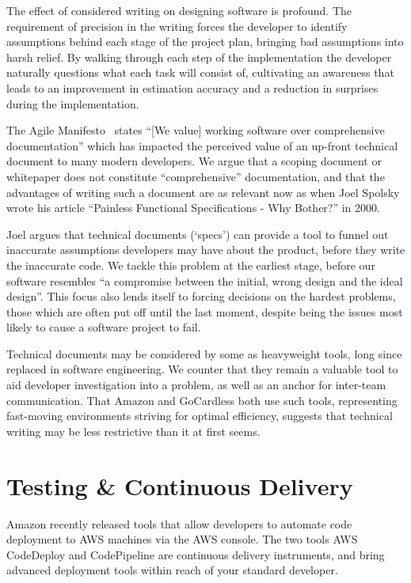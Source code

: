 \documentclass[11pt]{article}
\begin{document}
The effect of considered writing on designing software is profound. The
requirement of precision in the writing forces the developer to identify
assumptions behind each stage of the project plan, bringing bad assumptions into
harsh relief. By walking through each step of the implementation the developer
naturally questions what each task will consist of, cultivating an awareness
that leads to an improvement in estimation accuracy and a reduction in surprises
during the implementation.

The Agile Manifesto~\cite{agileManifesto} states “[We value] working software
over comprehensive documentation” which has impacted the perceived value of an
up-front technical document to many modern developers. We argue that a scoping
document or whitepaper does not constitute “comprehensive” documentation, and
that the advantages of writing such a document are as relevant now as when Joel
Spolsky wrote his article “Painless Functional Specifications - Why Bother?” in
2000.

Joel argues that technical documents (`specs') can provide a tool to funnel out
inaccurate assumptions developers may have about the product, before they write
the inaccurate code. We tackle this problem at the earliest stage, before our
software resembles “a compromise between the initial, wrong design and the ideal
design”. This focus also lends itself to forcing decisions on the hardest
problems, those which are often put off until the last moment, despite being the
issues most likely to cause a software project to fail.

Technical documents may be considered by some as heavyweight tools, long since
replaced in software engineering. We counter that they remain a valuable tool to
aid developer investigation into a problem, as well as an anchor for inter-team
communication. That Amazon and GoCardless both use such tools, representing
fast-moving environments striving for optimal efficiency, suggests that
technical writing may be less restrictive than it at first seems.

\section{Testing \& Continuous Delivery}

Amazon recently released tools that allow developers to automate code deployment
to AWS machines via the AWS console. The two tools AWS CodeDeploy and
CodePipeline are continuous delivery instruments, and bring advanced deployment
tools within reach of your standard developer.
\end{document}
